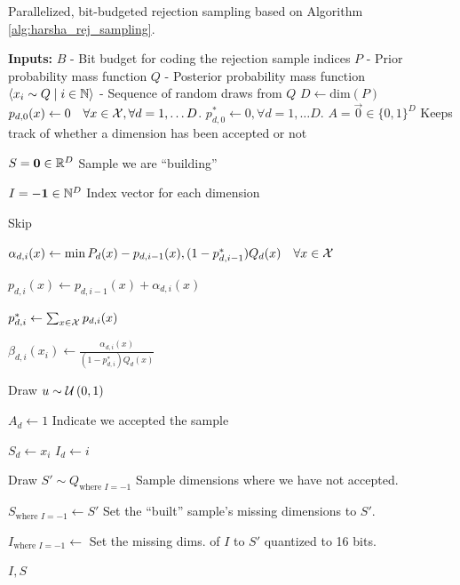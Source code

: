 \begin{algorithm}
  \caption{Parallelized, bit-budgeted rejection sampling based on Algorithm
    \ref{alg:harsha_rej_sampling}.}
  \label{alg:multivariate_rej_samp}
  \begin{algorithmic}
    \State \textbf{Inputs:}
    \State $B$ - Bit budget for coding the rejection sample indices
    \State $P$ - Prior probability mass function
    \State $Q$ - Posterior probability mass function
    \State $\langle x_i \sim Q \mid i \in \mathbb{N} \rangle$ - Sequence of random draws
    from $Q$
    \Statex
    \State $D \gets \text{dim}(P)$
    \State $p_{d, 0}(x) \gets 0 \quad \forall x \in \mathcal{X}, \forall d = 1,\hdots D$.
    \State $p_{d, 0}^* \gets 0, \forall d = 1,\hdots D$.
    \State $A = \vec{0} \in \{0, 1\}^D$
    \Comment Keeps track of whether a dimension has been accepted or not

    \State $S = \mathbf{0} \in \mathbb{R}^D$
    \Comment Sample we are ``building''

    \State $I = -\mathbf{1} \in \mathbb{N}^D$
    \Comment Index vector for each dimension




    \State Skip

    \EndIf


    \State
    $\alpha_{d, i}(x) \gets \min{P_d(x) - p_{d, i - 1}(x), (1 - p_{d, i - 1}^*)Q_d(x)}\quad
    \forall x \in \mathcal{X}$

    \State $p_{d, i}(x) \gets p_{d, i - 1}(x) + \alpha_{d, i}(x)$
    
    \State $p_{d, i}^* \gets \sum_{x \in \mathcal{X}}p_{d, i}(x)$

    \State $\beta_{d, i}(x_i) \gets \frac{\alpha_{d, i}(x)}{(1 - p_{d, i}^*)Q_d(x)}$

    \State Draw $u \sim \mathcal{U}\left( 0, 1 \right)$


    \State $A_d \gets 1$
    \Comment Indicate we accepted the sample

    \State $S_d \gets x_i$
    \State $I_d \gets i$

    \EndIf
    
    \EndFor
    \EndFor

    \State Draw $S' \sim Q_{\text{where } I = -1}$
    \Comment Sample dimensions where we have not accepted.

    \State $S_{\text{where } I = -1} \gets S'$
    \Comment Set the ``built'' sample's missing dimensions to $S'$.

    \State $I_{\text{where } I = -1} \gets $ 
    \Statex
    \Comment Set the missing dims. of $I$ to $S'$ quantized to 16 bits. 

    \State\Return $I, S$
    \EndProcedure
  \end{algorithmic}
\end{algorithm}

